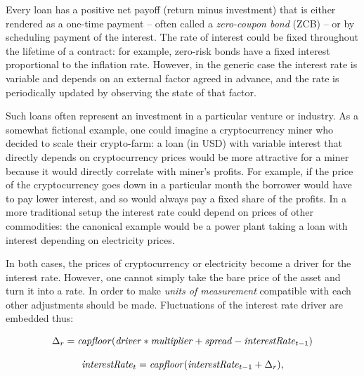 \documentclass[runningheads]{llncs}
\newcommand{\ident}[1]{\mbox{\emph{#1}}}
\begin{document}
Every loan has a positive net payoff (return minus investment) that
is either rendered as a one-time payment -- often called a \emph{zero-coupon bond} (ZCB) -- or by scheduling
payment of the interest. The rate of interest could be fixed throughout
the lifetime of a contract: for example, zero-risk bonds have a fixed
interest proportional to the inflation rate.
However, in the generic case the interest rate is variable and depends
on an external factor agreed in advance, and the rate is periodically
updated by observing the state of that factor. 

Such loans often represent an investment in a particular venture or industry. As
a somewhat fictional example, one could imagine a cryptocurrency miner
who decided to scale their crypto-farm: a loan (in USD) with variable
interest that directly depends on cryptocurrency prices would be more
attractive for a miner because it would directly correlate with miner's
profits. For example, if the price of the cryptocurrency goes down
in a particular month the borrower would have to pay lower interest, and so would always pay a fixed share of the profits. In a more traditional
setup the interest rate could depend on prices of other commodities: the canonical example would be a power plant taking a loan
with interest depending on electricity prices. 

In both cases, the prices of
cryptocurrency or electricity become a driver for the interest
rate.
However, one cannot simply take the bare price of the asset and turn
it into a rate. In order to make \emph{units of measurement} compatible with each other
adjustments should be made. Fluctuations of the interest rate driver
are embedded thus:



\noindent 
\begin{equation*}
\Delta_{r}=\ident{capfloor}(\ident{driver}*\ident{multiplier}+\ident{spread}-\ident{interestRate}_{t-1})
\end{equation*}

\noindent 
\begin{equation*}
\ident{interestRate}_{t}=\ident{capfloor}(\ident{interestRate}_{t-1}+\Delta_{r}),
\end{equation*}
\end{document}
